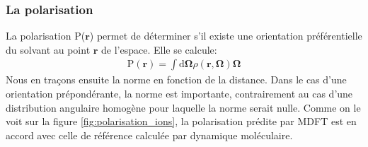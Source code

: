 \subsubsection{La polarisation}
La polarisation P($\boldsymbol{r}$) permet de déterminer s'il existe une orientation préférentielle du solvant au point $\boldsymbol{r}$ de l'espace. Elle se calcule:
\begin{eqnarray}
\mathrm{P}(\boldsymbol{r})=\int\mathrm{d}\boldsymbol{\Omega}\rho\left(\boldsymbol{r},\boldsymbol{\Omega} \right)\boldsymbol{\Omega}
\end{eqnarray}
Nous en traçons ensuite la norme en fonction de la distance. Dans le cas d'une orientation prépondérante, la norme est importante, contrairement au cas d'une distribution angulaire homogène pour laquelle la norme serait nulle.
Comme on le voit sur la figure \ref{fig:polarisation_ions}, la polarisation prédite par MDFT est en accord avec celle de référence calculée par dynamique moléculaire.


